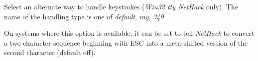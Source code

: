 \documentclass[titlepage]{article}
\begin{document}
\begin{description}[font=\mdseries\itshape]
\item[altkeyhandling]
Select an alternate way to handle keystrokes (\textit{Win32 tty NetHack} only).
The name of the handling type is one of \textit{default}, \textit{ray}, \textit{340}
\item[altmeta]
On systems where this option is available, it can be
set to tell \textit{NetHack} to convert a two character sequence beginning with
ESC into a meta-shifted version of the second character (default off).


\end{description}
\end{document}
